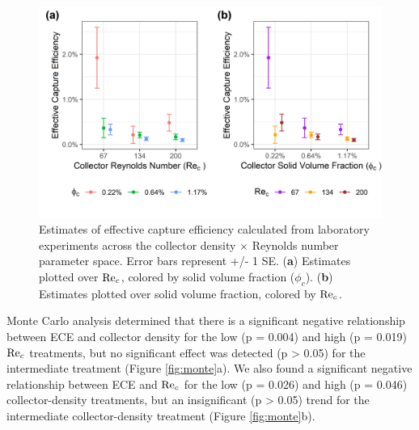 \documentclass[geosciences,article,submit,moreauthors,pdftex]{Definitions/mdpi}
\begin{document}
\begin{figure}[h]
\centering
\includegraphics[width=5in]{../pics/ece_plot.png}
\caption{Estimates of effective capture efficiency calculated from laboratory experiments across the collector density $\times$ Reynolds number parameter space. Error bars represent +/- 1 SE. (\textbf{a}) Estimates plotted over $\mathrm{Re}_c$, colored by solid volume fraction ($\phi_c$). (\textbf{b}) Estimates plotted over solid volume fraction, colored by $\mathrm{Re}_c$.}
\label{fig:ece}
\end{figure}   

Monte Carlo analysis determined that there is a significant negative relationship between ECE and collector density for the low (p = 0.004) and high (p = 0.019) $\mathrm{Re}_c$ treatments, but no significant effect was detected (p > 0.05) for the intermediate treatment (Figure \ref{fig:monte}a). We also found a significant negative relationship between ECE and $\mathrm{Re}_c$ for the low (p = 0.026) and high (p = 0.046) collector-density treatments, but an insignificant (p > 0.05) trend for the intermediate collector-density treatment (Figure \ref{fig:monte}b). 
\end{document}
